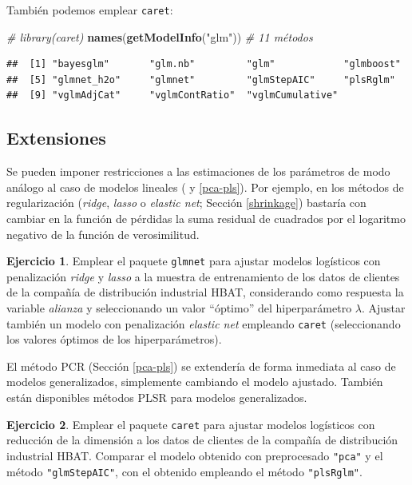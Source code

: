\documentclass[
]{book}
\newenvironment{Shaded}{\begin{snugshade}}{\end{snugshade}}
\newcommand{\CommentTok}[1]{\textcolor[rgb]{0.56,0.35,0.01}{\textit{#1}}}
\newcommand{\KeywordTok}[1]{\textcolor[rgb]{0.13,0.29,0.53}{\textbf{#1}}}
\newcommand{\NormalTok}[1]{#1}
\newcommand{\StringTok}[1]{\textcolor[rgb]{0.31,0.60,0.02}{#1}}
\theoremstyle{break}
\theoremstyle{definition}
\theoremstyle{definition}
\theoremstyle{definition}
\newtheorem{exercise}{Ejercicio}[chapter]
\theoremstyle{remark}
\begin{document}
También podemos emplear \texttt{caret}:

\begin{Shaded}
\begin{Highlighting}[]
\CommentTok{# library(caret)}
\KeywordTok{names}\NormalTok{(}\KeywordTok{getModelInfo}\NormalTok{(}\StringTok{"glm"}\NormalTok{)) }\CommentTok{# 11 métodos}
\end{Highlighting}
\end{Shaded}

\begin{verbatim}
##  [1] "bayesglm"       "glm.nb"         "glm"            "glmboost"      
##  [5] "glmnet_h2o"     "glmnet"         "glmStepAIC"     "plsRglm"       
##  [9] "vglmAdjCat"     "vglmContRatio"  "vglmCumulative"
\end{verbatim}

\hypertarget{extensiones}{%
\subsection{Extensiones}\label{extensiones}}

Se pueden imponer restricciones a las estimaciones de los parámetros de modo análogo al caso de modelos lineales ( y \ref{pca-pls}).
Por ejemplo, en los métodos de regularización (\emph{ridge}, \emph{lasso} o \emph{elastic net}; Sección \ref{shrinkage}) bastaría con cambiar en la función de pérdidas la suma residual de cuadrados por el logaritmo negativo de la función de verosimilitud.

\begin{exercise}
\protect\hypertarget{exr:glmnet}{}{\label{exr:glmnet} }
Emplear el paquete \texttt{glmnet} para ajustar modelos logísticos con penalización \emph{ridge} y \emph{lasso} a la muestra de entrenamiento de los datos de clientes de la compañía de distribución industrial HBAT, considerando como respuesta la variable \emph{alianza} y seleccionando un valor ``óptimo'' del hiperparámetro \(\lambda\).
Ajustar también un modelo con penalización \emph{elastic net} empleando \texttt{caret} (seleccionando los valores óptimos de los hiperparámetros).
\end{exercise}

El método PCR (Sección \ref{pca-pls}) se extendería de forma inmediata al caso de modelos generalizados, simplemente cambiando el modelo ajustado.
También están disponibles métodos PLSR para modelos generalizados.

\begin{exercise}
\protect\hypertarget{exr:glm-reduccion}{}{\label{exr:glm-reduccion} }
Emplear el paquete \texttt{caret} para ajustar modelos logísticos con reducción de la dimensión a los datos de clientes de la compañía de distribución industrial HBAT. Comparar el modelo obtenido con preprocesado \texttt{"pca"} y el método \texttt{"glmStepAIC"}, con el obtenido empleando el método \texttt{"plsRglm"}.
\end{exercise}
\end{document}
